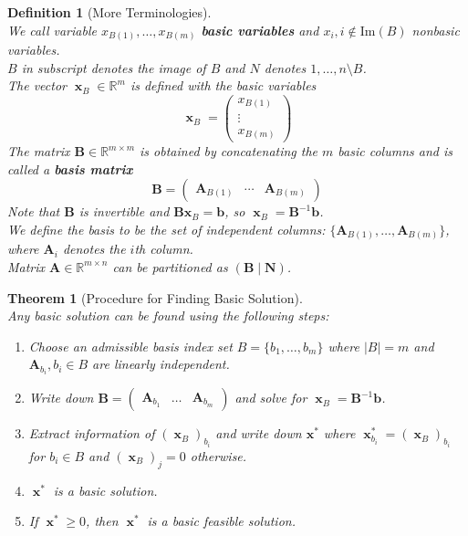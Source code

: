 \documentclass[12pt]{article}
\newcommand{\ima}{\mathrm{Im}}
\newtheorem{definition}{Definition}[section]
\newtheorem{theorem}{Theorem}[section]
\theoremstyle{definition}
\DeclareMathOperator{\x}{\mathbf{x}}
\begin{document}
\begin{definition}[More Terminologies]
\hfill\\\normalfont
We call variable $x_{B(1)},\ldots, x_{B(m)}$ \textbf{basic variables} and $x_i, i\not\in \ima(B)$ nonbasic variables.\\
$B$ in subscript denotes the image of $B$ and $N$ denotes ${1,\ldots, n}\setminus B$.\\
The vector $\x_B\in \mathbb{R}^m$ is defined with the basic variables
\[
\x_B = \begin{pmatrix}x_{B(1)}\\\vdots\\x_{B(m)}\end{pmatrix}
\]
The matrix $\mathbf{B}\in \mathbb{R}^{m\times m}$ is obtained by concatenating the $m$ basic columns and is called a \textbf{basis matrix}
\[
\mathbf{B}=\begin{pmatrix} \mathbf{A}_{B(1)}&\cdots&\mathbf{A}_{B(m)}\end{pmatrix}
\]
Note that $\mathbf{B}$ is invertible and $\mathbf{Bx}_B= \mathbf{b}$, so $\x_B = \mathbf{B}^{-1}\mathbf{b}$.\\
We define the basis to be the set of independent columns: $\{\mathbf{A}_{B(1)}, \ldots, \mathbf{A}_{B(m)}\}$, where $\mathbf{A}_i$ denotes the $i$th column.\\
Matrix $\mathbf{A}\in\mathbb{R}^{m\times n}$ can be partitioned as $(\mathbf{B}\mid \mathbf{N})$.
\end{definition}
\begin{theorem}[Procedure for Finding Basic Solution]
\hfill\\\normalfont Any basic solution can be found using the following steps:
\begin{enumerate}
  \item Choose an admissible basis index set $B=\{b_1, \ldots, b_m\}$ where $|B|=m$ and $\mathbf{A}_{b_i}, b_i\in B$ are linearly independent.
  \item Write down $\mathbf{B}=\begin{pmatrix}\mathbf{A}_{b_1}&\ldots&\mathbf{A}_{b_m}\end{pmatrix}$ and solve for $\x_B=\mathbf{B}^{-1}\mathbf{b}$.
  \item Extract information of $(\x_B)_{b_i}$ and write down $\mathbf{x}^\ast$ where $\x^\ast_{b_i}=(\x_B)_{b_i}$ for $b_i\in B$ and $(\x_B)_j = 0$ otherwise.
  \item $\x^\ast$ is a basic solution.
  \item If $\x^\ast\geq 0$, then $\x^\ast$ is a basic feasible solution.
\end{enumerate}
\end{theorem}
\end{document}
